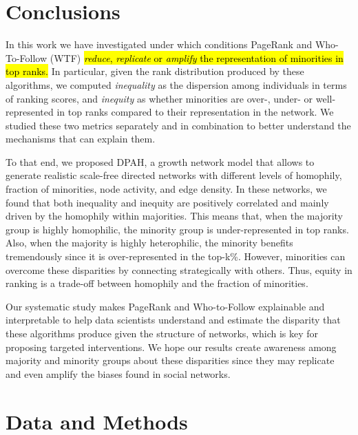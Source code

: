 \documentclass[fleqn,10pt]{wlscirep}
\begin{document}
\section*{Conclusions}
In this work we have investigated under which conditions {PageRank} and Who-To-Follow (WTF) \hl{\textit{reduce}, \textit{replicate} or \textit{amplify} the representation of minorities in top ranks. }
In particular, given the rank distribution produced by these algorithms, we computed \textit{inequality} as the dispersion among individuals in terms of ranking scores, and \textit{inequity} as whether minorities are over-, under- or well-represented in top ranks compared to their representation in the network. %
We studied these two metrics separately and in combination to better understand the mechanisms that can explain them. 

To that end, we proposed {DPAH}, a growth network model that allows to generate realistic scale-free directed networks with different levels of homophily, fraction of minorities, node activity, and edge density. 
In these networks, we found that both inequality and inequity are positively correlated and mainly driven by the homophily within majorities. 
This means that, when the majority group is highly homophilic, the minority group is under-represented in top ranks. Also, when the majority is highly heterophilic, the minority benefits tremendously since it is over-represented in the top-k\%. However, minorities can overcome these disparities by connecting strategically with others. Thus, equity in ranking is a trade-off between homophily and the fraction of minorities. 
%

Our systematic study makes PageRank and Who-to-Follow explainable and interpretable to help data scientists understand and estimate the disparity that these algorithms produce given the structure of networks, which is key for proposing targeted interventions.
We hope our results create awareness among majority and minority groups about these disparities %
since they may replicate and even amplify the biases found in social networks.






\section*{Data and Methods}
\end{document}

